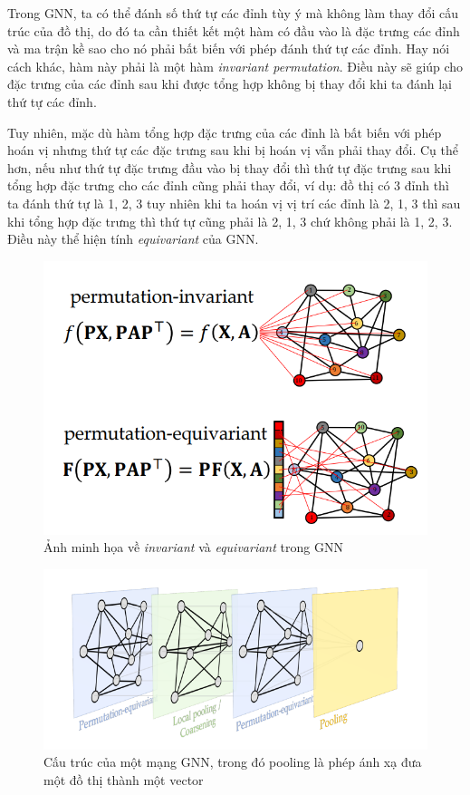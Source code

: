 Trong GNN, ta có thể đánh số thứ tự các đỉnh tùy ý mà không làm thay đổi cấu trúc của đồ thị, do đó ta cần thiết kết một hàm có đầu vào là đặc trưng các đỉnh và ma trận kề sao cho nó phải bất biến với phép đánh thứ tự các đỉnh. Hay nói cách khác, hàm này phải là một hàm \textit{invariant permutation}. Điều này sẽ giúp cho đặc trưng của các đỉnh sau khi được tổng hợp không bị thay đổi khi ta đánh lại thứ tự các đỉnh.

Tuy nhiên, mặc dù hàm tổng hợp đặc trưng của các đỉnh là bất biến với phép hoán vị nhưng thứ tự các đặc trưng sau khi bị hoán vị vẫn phải thay đổi. Cụ thể hơn, nếu như thứ tự đặc trưng đầu vào bị thay đổi thì thứ tự đặc trưng sau khi tổng hợp đặc trưng cho các đỉnh cũng phải thay đổi, ví dụ: đồ thị có 3 đỉnh thì ta đánh thứ tự là 1, 2, 3 tuy nhiên khi ta hoán vị vị trí các đỉnh là 2, 1, 3 thì sau khi tổng hợp đặc trưng thì thứ tự cũng phải là 2, 1, 3 chứ không phải là 1, 2, 3. Điều này thể hiện tính \textit{equivariant} của GNN.

\begin{figure}[H]
    \centering
    \includegraphics[width=1\linewidth]{Images/GDL/graph/inva_equi_permutation.png}
    \caption{Ảnh minh họa về \textit{invariant} và \textit{equivariant} trong GNN\cite{geometricdeep2022}}
\end{figure}

\begin{figure}[H]
    \centering
    \captionsetup{justification=centering}
    \includegraphics[width=1\linewidth]{Images/GDL/graph/gnn_structure.png}
    \caption{Cấu trúc của một mạng GNN, trong đó pooling là phép ánh xạ đưa một đồ thị thành một vector\cite{geometricdeep2022}}
\end{figure}

